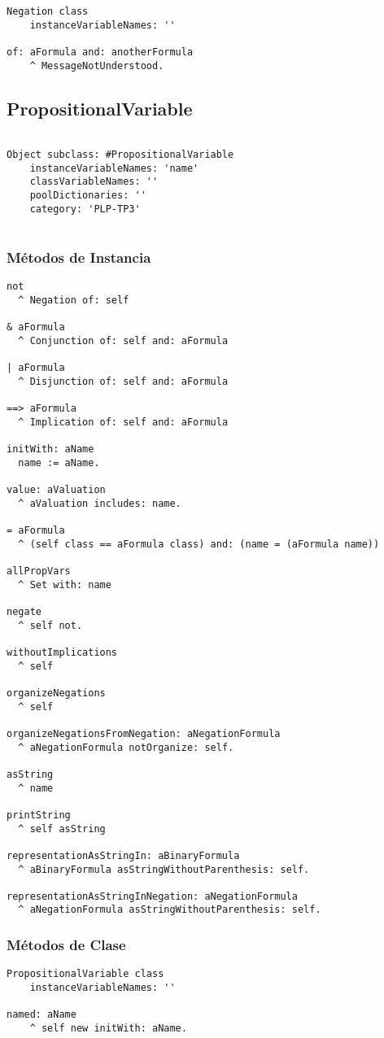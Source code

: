 \documentclass[spanish, 10pt,a4paper]{article}
\numberwithin{equation}{section} %
\begin{document}
\begin{lstlisting}
Negation class
	instanceVariableNames: ''

of: aFormula and: anotherFormula
	^ MessageNotUnderstood.

\end{lstlisting}

\subsection{PropositionalVariable}

\begin{lstlisting}

Object subclass: #PropositionalVariable
	instanceVariableNames: 'name'
	classVariableNames: ''
	poolDictionaries: ''
	category: 'PLP-TP3'


\end{lstlisting}

\subsubsection{Métodos de Instancia}
\begin{lstlisting}
not 
  ^ Negation of: self

& aFormula
  ^ Conjunction of: self and: aFormula

| aFormula
  ^ Disjunction of: self and: aFormula

==> aFormula
  ^ Implication of: self and: aFormula

initWith: aName
  name := aName.

value: aValuation
  ^ aValuation includes: name.

= aFormula
  ^ (self class == aFormula class) and: (name = (aFormula name))

allPropVars
  ^ Set with: name 

negate
  ^ self not.

withoutImplications 
  ^ self

organizeNegations
  ^ self

organizeNegationsFromNegation: aNegationFormula
  ^ aNegationFormula notOrganize: self.

asString
  ^ name

printString
  ^ self asString

representationAsStringIn: aBinaryFormula
  ^ aBinaryFormula asStringWithoutParenthesis: self.

representationAsStringInNegation: aNegationFormula
  ^ aNegationFormula asStringWithoutParenthesis: self.

\end{lstlisting}
\subsubsection{Métodos de Clase}

\begin{lstlisting}
PropositionalVariable class
	instanceVariableNames: ''

named: aName
	^ self new initWith: aName.

 \end{lstlisting}
\end{document}
